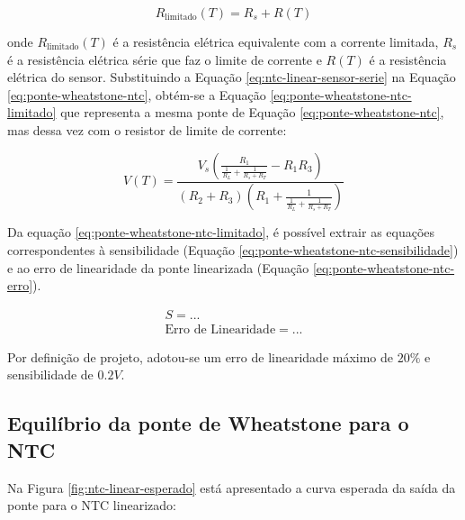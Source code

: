 \documentclass[a4paper]{instrumentacao}
\begin{document}
\begin{equation}
	R_{\text{limitado}}(T) = R_s + R(T)
	\label{eq:ntc-linear-sensor-serie}
\end{equation}

\noindent onde $R_{\text{limitado}}(T)$ é a resistência elétrica equivalente com a corrente limitada, $R_s$ é a resistência elétrica série que faz o limite de corrente e $R(T)$ é a resistência elétrica do sensor. Substituindo a Equação \ref{eq:ntc-linear-sensor-serie} na Equação \ref{eq:ponte-wheatstone-ntc}, obtém-se a Equação \ref{eq:ponte-wheatstone-ntc-limitado} que representa a mesma ponte de Equação \ref{eq:ponte-wheatstone-ntc}, mas dessa vez com o resistor de limite de corrente:

\begin{equation}
	V(T) = \frac{V_s \left(\frac{R_1}{\frac{1}{R_L}+\frac{1}{R_s+R_T}}-R_1 R_3\right)}{(R_2+R_3) \left(R_1+\frac{1}{\frac{1}{R_L}+\frac{1}{R_s+R_T}}\right)}
	\label{eq:ponte-wheatstone-ntc-limitado}
\end{equation}

Da equação \ref{eq:ponte-wheatstone-ntc-limitado}, é possível extrair as equações correspondentes à sensibilidade (Equação \ref{eq:ponte-wheatstone-ntc-sensibilidade}) e ao erro de linearidade da ponte linearizada  (Equação \ref{eq:ponte-wheatstone-ntc-erro}).

\begin{eqnarray}
	S 							= ...			\\ \label{eq:ponte-wheatstone-ntc-sensibilidade}
	\text{Erro de Linearidade} = ...			 	   \label{eq:ponte-wheatstone-ntc-erro}
\end{eqnarray}


Por definição de projeto, adotou-se um erro de linearidade máximo de $20\%$ e sensibilidade de $0.2 V$. 

\subsection{Equilíbrio da ponte de Wheatstone para o NTC}


Na Figura \ref{fig:ntc-linear-esperado} está apresentado a curva esperada da saída da ponte para o NTC linearizado:
\end{document}
